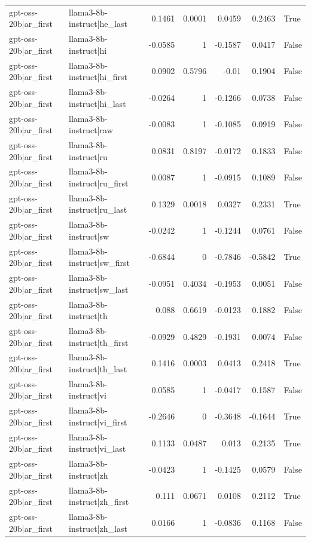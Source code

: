 \begin{table}
\begin{tabular}{l l r r r r l}
gpt-oss-20b|ar_first & llama3-8b-instruct|he_last & 0.1461 & 0.0001 & 0.0459 & 0.2463 & True \\
gpt-oss-20b|ar_first & llama3-8b-instruct|hi & -0.0585 & 1 & -0.1587 & 0.0417 & False \\
gpt-oss-20b|ar_first & llama3-8b-instruct|hi_first & 0.0902 & 0.5796 & -0.01 & 0.1904 & False \\
gpt-oss-20b|ar_first & llama3-8b-instruct|hi_last & -0.0264 & 1 & -0.1266 & 0.0738 & False \\
gpt-oss-20b|ar_first & llama3-8b-instruct|raw & -0.0083 & 1 & -0.1085 & 0.0919 & False \\
gpt-oss-20b|ar_first & llama3-8b-instruct|ru & 0.0831 & 0.8197 & -0.0172 & 0.1833 & False \\
gpt-oss-20b|ar_first & llama3-8b-instruct|ru_first & 0.0087 & 1 & -0.0915 & 0.1089 & False \\
gpt-oss-20b|ar_first & llama3-8b-instruct|ru_last & 0.1329 & 0.0018 & 0.0327 & 0.2331 & True \\
gpt-oss-20b|ar_first & llama3-8b-instruct|sw & -0.0242 & 1 & -0.1244 & 0.0761 & False \\
gpt-oss-20b|ar_first & llama3-8b-instruct|sw_first & -0.6844 & 0 & -0.7846 & -0.5842 & True \\
gpt-oss-20b|ar_first & llama3-8b-instruct|sw_last & -0.0951 & 0.4034 & -0.1953 & 0.0051 & False \\
gpt-oss-20b|ar_first & llama3-8b-instruct|th & 0.088 & 0.6619 & -0.0123 & 0.1882 & False \\
gpt-oss-20b|ar_first & llama3-8b-instruct|th_first & -0.0929 & 0.4829 & -0.1931 & 0.0074 & False \\
gpt-oss-20b|ar_first & llama3-8b-instruct|th_last & 0.1416 & 0.0003 & 0.0413 & 0.2418 & True \\
gpt-oss-20b|ar_first & llama3-8b-instruct|vi & 0.0585 & 1 & -0.0417 & 0.1587 & False \\
gpt-oss-20b|ar_first & llama3-8b-instruct|vi_first & -0.2646 & 0 & -0.3648 & -0.1644 & True \\
gpt-oss-20b|ar_first & llama3-8b-instruct|vi_last & 0.1133 & 0.0487 & 0.013 & 0.2135 & True \\
gpt-oss-20b|ar_first & llama3-8b-instruct|zh & -0.0423 & 1 & -0.1425 & 0.0579 & False \\
gpt-oss-20b|ar_first & llama3-8b-instruct|zh_first & 0.111 & 0.0671 & 0.0108 & 0.2112 & True \\
gpt-oss-20b|ar_first & llama3-8b-instruct|zh_last & 0.0166 & 1 & -0.0836 & 0.1168 & False \\

\end{tabular}
\end{table}
